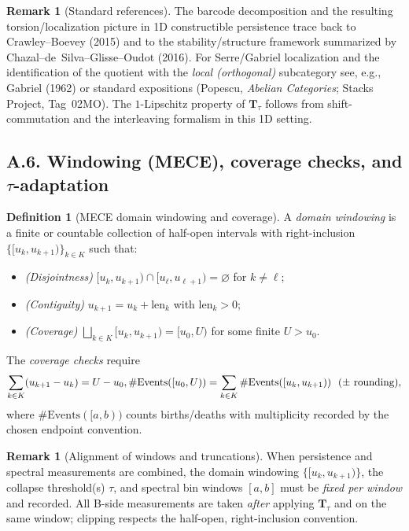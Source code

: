 \documentclass[11pt]{article}
\DeclareRobustCommand{\hyp}{\nobreakdash-}
\numberwithin{equation}{section}
\theoremstyle{definition}
\newtheorem{definition}[theorem]{Definition}
\newtheorem{remark}[theorem]{Remark}
\providecommand{\n}{\unskip\space}
\begin{document}
\begin{remark}[Standard references]
The barcode decomposition and the resulting torsion/localization picture in 1D constructible persistence trace back to Crawley–Boevey (2015) and to the stability/structure framework summarized by Chazal–de~Silva–Glisse–Oudot (2016).
For Serre/Gabriel localization and the identification of the quotient with the \emph{local (orthogonal)} subcategory see, e.g., Gabriel (1962) or standard expositions (Popescu, \emph{Abelian Categories}; Stacks Project, Tag~02MO).
The \(1\)-Lipschitz property of \(\mathbf{T}_\tau\) follows from shift-commutation and the interleaving formalism in this 1D setting.
\end{remark}

\subsection*{A.6. Windowing (MECE), coverage checks, and \texorpdfstring{$\tau$}{tau}-adaptation}
\begin{definition}[MECE domain windowing and coverage]\label{A:def:MECE}
A \emph{domain windowing} is a finite or countable collection of half-open intervals with right-inclusion
\(\{[u_k,u_{k+1})\}_{k\in K}\) such that:
\begin{itemize}
  \item \emph{(Disjointness)} \([u_k,u_{k+1})\cap [u_\ell,u_{\ell+1})=\varnothing\) for \(k\neq \ell\);
  \item \emph{(Contiguity)} \(u_{k+1}=u_k+\mathrm{len}_k\) with \(\mathrm{len}_k>0\);
  \item \emph{(Coverage)} \(\bigsqcup_{k\in K}[u_k,u_{k+1})=[u_0,U)\) for some finite \(U>u_0\).
\end{itemize}
The \emph{coverage checks} require
\[
\sum_{k\in K}(u_{k+1}-u_k)=U-u_0,\qquad\n\#\mathrm{Events}([u_0,U))=\sum_{k\in K}\#\mathrm{Events}([u_k,u_{k+1}))\ \ (\pm\ \text{rounding}),
\]
where \(\#\mathrm{Events}([a,b))\) counts births/deaths with multiplicity recorded by the chosen endpoint convention.
\end{definition}

\begin{remark}[Alignment of windows and truncations]
When persistence and spectral measurements are combined, the domain windowing \(\{[u_k,u_{k+1})\}\), the collapse threshold(s) \(\tau\), and spectral bin windows \([a,b]\) must be \emph{fixed per window} and recorded. All B\hyp side measurements are taken \emph{after} applying \(\mathbf{T}_\tau\) and on the same window; clipping respects the half-open, right-inclusion convention.
\end{remark}
\end{document}
